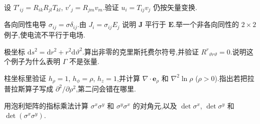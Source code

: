 \begin{problemset}
\item 设 $T'_{ij}=R_{ik}R_{jl}T_{kl}$, $v'_j=R_{jm}v_m$.验证 $u_i=T_{ij}v_j$ 仍按矢量变换.

\item 各向同性电导 $\sigma_{ij}=\sigma\delta_{ij}$.由 $J_i=\sigma_{ij}E_j$ 说明 $\mathbf{J}$ 平行于 $\mathbf{E}$.举一个非各向同性的 $2\times 2$ 例子,使电流不平行于电场.

\item 极坐标 $\mathrm{d}s^2=\mathrm{d}r^2+r^2\mathrm{d}\vartheta^2$.算出非零的克里斯托费尔符号,并验证 $R^r{}_{\vartheta r\vartheta}=0$.说明这个例子为什么表明 $\Gamma$ 不是张量.

\item 柱坐标里验证 $h_\rho=1$, $h_\phi=\rho$, $h_z=1$,并计算 $\nabla\cdot\mathbf{e}_\rho$ 和 $\nabla^2\ln\rho$ ($\rho>0$).指出若把拉普拉斯算子写成 $\partial^2/\partial\rho^2$,第二问会错在哪里.

\item 用泡利矩阵的指标乘法计算 $\sigma^x\sigma^y$ 和 $\sigma^y\sigma^x$ 的对角元,以及 $\det\sigma^x$, $\det\sigma^y$ 和 $\det(\sigma^x\sigma^y)$.
\end{problemset}
